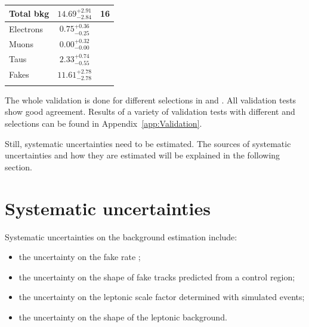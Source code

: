 \begin{table}[!t]
{\begin{tabular}{l|c |c}
\midrule
Total bkg                                                      &       $14.69^{+2.91}_{-2.84}$            &  16        \\
\midrule
Electrons                                                      &       $0.75^{ + 0.36}_{ - 0.25}$            &                \\
Muons                                                          &       $0.00^{ + 0.32}_{- 0.00}$            &            \\
Taus                                                           &       $2.33^{ + 0.74}_{- 0.55}$            &          \\
Fakes                                                          &       $11.61^{+2.78}_{-2.78}$            &          \\
\bottomrule
\multicolumn{3}{c}{} 
\end{tabular}}
\end{table}


The whole validation is done for different selections in \pt and \ias.
All validation tests show good agreement.
Results of a variety of validation tests with different \pt and \ias selections can be found in Appendix~\ref{app:Validation}.

Still, systematic uncertainties need to be estimated.
The sources of systematic uncertainties and how they are estimated will be explained in the following section.\\

\FloatBarrier
\section{Systematic uncertainties}
\label{sec:SysUncertaintiesBkg}

Systematic uncertainties on the background estimation include:
\begin{itemize}
\item the uncertainty on the fake rate \fakerate;
\item the uncertainty on the \ias shape of fake tracks predicted from a control region;
\item the uncertainty on the leptonic scale factor \leptonscalefactor determined with simulated events;
\item the uncertainty on the \ias shape of the leptonic background.
\end{itemize}

